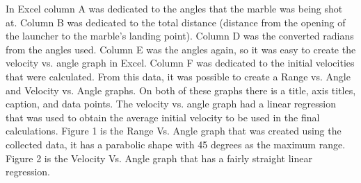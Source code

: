 \documentclass[aps,letterpaper,11pt]{revtex4}
\begin{document}
In Excel column A was dedicated to the angles that the marble was being shot at. Column B was dedicated to the total distance (distance from the opening of the launcher to the marble's landing point). Column D was the converted radians from the angles used. Column E was the angles again, so it was easy to create the velocity vs. angle graph in Excel. Column F was dedicated to the initial velocities that were calculated. From this data, it was possible to create a Range vs. Angle and Velocity vs. Angle graphs. On both of these graphs there is a title, axis titles, caption, and data points. The velocity vs. angle graph had a linear regression that was used to obtain the average initial velocity to be used in the final calculations. Figure 1 is the Range Vs. Angle graph that was created using the collected data, it has a parabolic shape with 45 degrees as the maximum range. Figure 2 is the Velocity Vs. Angle graph that has a fairly straight linear regression.
\end{document}
